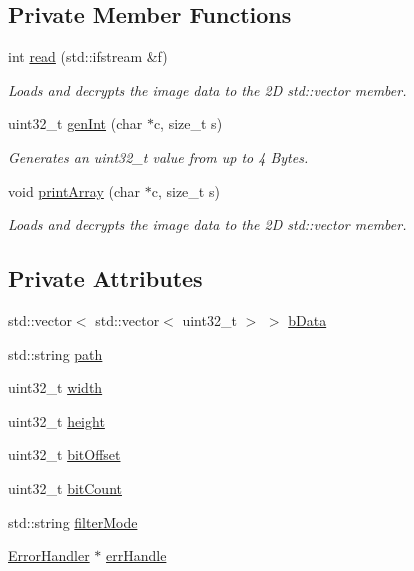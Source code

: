 \subsection*{Private Member Functions}
\begin{DoxyCompactItemize}
\item 
int \mbox{\hyperlink{classBitmapArray_a3a5834d03cd095769b422d4d66b9435f}{read}} (std\+::ifstream \&f)
\begin{DoxyCompactList}\small\item\em Loads and decrypts the image data to the 2D std\+::vector member. \end{DoxyCompactList}\item 
uint32\+\_\+t \mbox{\hyperlink{classBitmapArray_a158fbbaa026332a732f644a8c368a2f0}{gen\+Int}} (char $\ast$c, size\+\_\+t s)
\begin{DoxyCompactList}\small\item\em Generates an uint32\+\_\+t value from up to 4 Bytes. \end{DoxyCompactList}\item 
void \mbox{\hyperlink{classBitmapArray_a99a8a164e51e29407f24dab4752232c1}{print\+Array}} (char $\ast$c, size\+\_\+t s)
\begin{DoxyCompactList}\small\item\em Loads and decrypts the image data to the 2D std\+::vector member. \end{DoxyCompactList}\end{DoxyCompactItemize}
\subsection*{Private Attributes}
\begin{DoxyCompactItemize}
\item 
std\+::vector$<$ std\+::vector$<$ uint32\+\_\+t $>$ $>$ \mbox{\hyperlink{classBitmapArray_a4af158b9be17ce7ebeab8729c2b34ab2}{b\+Data}}
\item 
std\+::string \mbox{\hyperlink{classBitmapArray_a3a3e1fbdd198c6731c7f6e20fb492445}{path}}
\item 
uint32\+\_\+t \mbox{\hyperlink{classBitmapArray_a44f51b2c1ecde3f9aa504df25d65b6c9}{width}}
\item 
uint32\+\_\+t \mbox{\hyperlink{classBitmapArray_adb8d1a8fcc55c3884ad3eea71c6042be}{height}}
\item 
uint32\+\_\+t \mbox{\hyperlink{classBitmapArray_abcab200a1eb84331f7c79702e9199694}{bit\+Offset}}
\item 
uint32\+\_\+t \mbox{\hyperlink{classBitmapArray_a18127e27d4b1477fd46ef0c0b3dbc110}{bit\+Count}}
\item 
std\+::string \mbox{\hyperlink{classBitmapArray_adfd3e5a1eed42e37b22a4f2f2560ad67}{filter\+Mode}}
\item 
\mbox{\hyperlink{classErrorHandler}{Error\+Handler}} $\ast$ \mbox{\hyperlink{classBitmapArray_a8d95e8cb2bf8c0f618465a389e8ffe4d}{err\+Handle}}
\end{DoxyCompactItemize}


